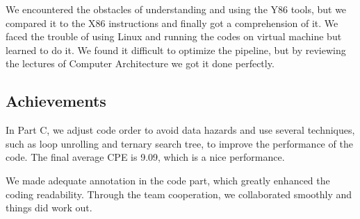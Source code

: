 \documentclass{article}
\begin{document}
We encountered the obstacles of understanding and using the Y86 tools, but we compared it to the X86 instructions and finally got a comprehension of it. We faced the trouble of using Linux and running the codes on virtual machine but learned to do it. We found it difficult to optimize the pipeline, but by reviewing the lectures of Computer Architecture we got it done perfectly.

\subsection{Achievements}

In Part C, we adjust code order to avoid data hazards and use several techniques, such as loop unrolling and ternary search tree, to improve the performance of the code. The final average CPE is 9.09, which is a nice performance.

We made adequate annotation in the code part, which greatly enhanced the coding readability. Through the team cooperation, we collaborated smoothly and things did work out. 

\end{document}
